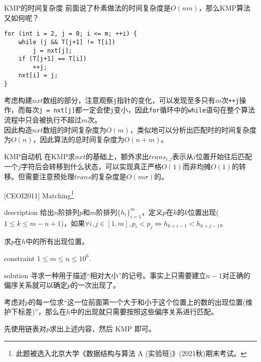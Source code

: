 \documentclass{beamer}
\theoremstyle{compact}
\def\le{\leqslant}
\begin{document}
\begin{frame}[fragile]{KMP的时间复杂度}
	前面说了朴素做法的时间复杂度是$O(nm)$，那么KMP算法又如何呢？
	\pause
	
	\begin{verbatim}
for (int i = 2, j = 0; i <= m; ++i) {
    while (j && T[j+1] != T[i])
        j = nxt[j];
    if (T[j+1] == T[i])
        ++j;
    nxt[i] = j;
}
	\end{verbatim}
	
	考虑构建$nxt$数组的部分，注意观察\texttt{j}指针的变化，可以发现至多只有$m$次\texttt{++j}操作，而每次\texttt{j = nxt[j]}都一定会使\texttt{j}变小，因此\texttt{for}循环中的\texttt{while}语句在整个算法流程中只会被执行不超过$m$次。
	\pause\\
	
	因此构造$nxt$数组的时间复杂度为$O(m)$，类似地可以分析出匹配时的时间复杂度为$O(n)$，因此算法的总时间复杂度为$O(n+m)$。
\end{frame}
\begin{frame}{KMP自动机}
	在KMP求$nxt$的基础上，额外求出$trans_{i,j}$表示从$i$位置开始往后匹配一个$j$字符后会转移到什么状态，可以实现真正严格$O(1)$而非均摊$O(1)$的转移。但需要注意预处理$trans$的复杂度是$O(m\sigma)$的。
\end{frame}
\begin{frame}{[CEOI2011] Matching\footnote{\tiny 此题被选入北京大学《数据结构与算法 A (实验班)》(2021秋)期末考试。}}
	\begin{block}{description}
		给出$n$阶排列$p$和$m$阶排列$\{h_i\}_{i=1}^{m}$，定义$p$在$h$的$k$位置出现($1 \le k \le m - n + 1$)，如果$\forall i, j \in [1, m], p_i < p_j \Leftrightarrow h_{k+i-1} < h_{k+j-1}$。

		求$p$在$h$中的所有出现位置。
	\end{block}
	\begin{block}{constraint}
		$1 \le m \le n \le 10^6.$
	\end{block}
	\pause
	\begin{block}{solution}
		寻求一种用于描述“相对大小”的记号。事实上只需要建立$n-1$对正确的偏序关系就可以确定$p$的一次出现了。\pause

		考虑对$p$的每一位求“这一位前面第一个大于和小于这个位置上的数的出现位置(维护下标差)”，那么在$h$中的出现就只需要按照这些偏序关系进行匹配。\pause

		先使用链表对$p$求出上述内容，然后 KMP 即可。

	\end{block}
\end{frame}
\end{document}
